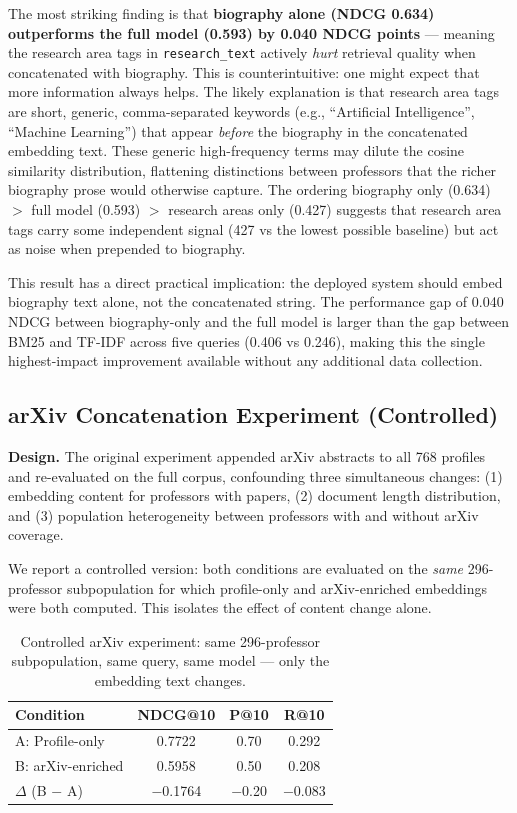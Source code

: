 \documentclass[11pt,a4paper]{article}
\begin{document}
The most striking finding is that \textbf{biography alone (NDCG 0.634)
outperforms the full model (0.593) by 0.040 NDCG points} ---
meaning the research area tags in \texttt{research\_text} actively
\emph{hurt} retrieval quality when concatenated with biography.
This is counterintuitive: one might expect that more information
always helps. The likely explanation is that research area tags are
short, generic, comma-separated keywords (e.g., ``Artificial
Intelligence'', ``Machine Learning'') that appear \emph{before}
the biography in the concatenated embedding text. These generic
high-frequency terms may dilute the cosine similarity distribution,
flattening distinctions between professors that the richer biography
prose would otherwise capture. The ordering
biography only (0.634) $>$ full model (0.593) $>$
research areas only (0.427) suggests that research area tags carry
some independent signal (427 vs the lowest possible baseline) but
act as noise when prepended to biography.

This result has a direct practical implication: the deployed system
should embed biography text alone, not the concatenated string.
The performance gap of 0.040 NDCG between biography-only and the
full model is larger than the gap between BM25 and TF-IDF across
five queries (0.406 vs 0.246), making this the single highest-impact
improvement available without any additional data collection.

\subsection{arXiv Concatenation Experiment (Controlled)}
\label{sec:arxiv}

\textbf{Design.}
The original experiment appended arXiv abstracts to all 768 profiles and
re-evaluated on the full corpus, confounding three simultaneous changes:
(1) embedding content for professors with papers, (2) document length
distribution, and (3) population heterogeneity between professors
with and without arXiv coverage.

We report a controlled version: both conditions are evaluated on the
\emph{same} 296-professor subpopulation for which profile-only and
arXiv-enriched embeddings were both computed. This isolates the effect
of content change alone.

\begin{table}[H]
\centering
\caption{Controlled arXiv experiment: same 296-professor subpopulation,
same query, same model --- only the embedding text changes.}
\label{tab:arxiv}
\begin{tabular}{lccc}
\toprule
\textbf{Condition} & \textbf{NDCG@10} & \textbf{P@10} & \textbf{R@10} \\
\midrule
A: Profile-only    & 0.7722 & 0.70 & 0.292 \\
B: arXiv-enriched  & 0.5958 & 0.50 & 0.208 \\
\midrule
$\Delta$ (B $-$ A) & $-$0.1764 & $-$0.20 & $-$0.083 \\
\bottomrule
\end{tabular}
\end{table}
\end{document}

